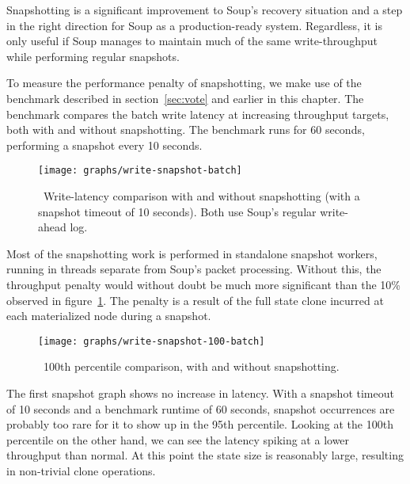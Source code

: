 Snapshotting is a significant improvement to Soup's recovery situation and a
step in the right direction for Soup as a production-ready system. Regardless,
it is only useful if Soup manages to maintain much of the same write-throughput
while performing regular snapshots.

To measure the performance penalty of snapshotting, we make use of the
 benchmark described in section~\ref{sec:vote} and earlier in this
chapter. The benchmark compares the batch write latency at increasing throughput
targets, both with and without snapshotting. The benchmark runs for 60 seconds,
performing a snapshot every 10 seconds.

\begin{figure}[H]
  \texttt{[image: graphs/write-snapshot-batch]}
  \caption{\
    Write-latency comparison with and without snapshotting (with a snapshot
    timeout of 10 seconds). Both use Soup's regular write-ahead log.
  }\label{fig:graph-snapshot}
\end{figure}

Most of the snapshotting work is performed in standalone snapshot workers,
running in threads separate from Soup's packet processing. Without this, the
throughput penalty would without doubt be much more significant than the 10\%
observed in figure~\ref{fig:graph-snapshot}. The penalty is a result of the full
state clone incurred at each materialized node during a snapshot.

\begin{figure}[H]
  \texttt{[image: graphs/write-snapshot-100-batch]}
  \caption{\
    100th percentile comparison, with and without snapshotting.
  }\label{fig:graph-snapshot-100}
\end{figure}

The first snapshot graph shows no increase in latency. With a snapshot timeout
of 10 seconds and a benchmark runtime of 60 seconds, snapshot occurrences are
probably too rare for it to show up in the 95th percentile. Looking at the 100th
percentile on the other hand, we can see the latency spiking at a lower
throughput than normal. At this point the state size is reasonably large,
resulting in non-trivial clone operations.
